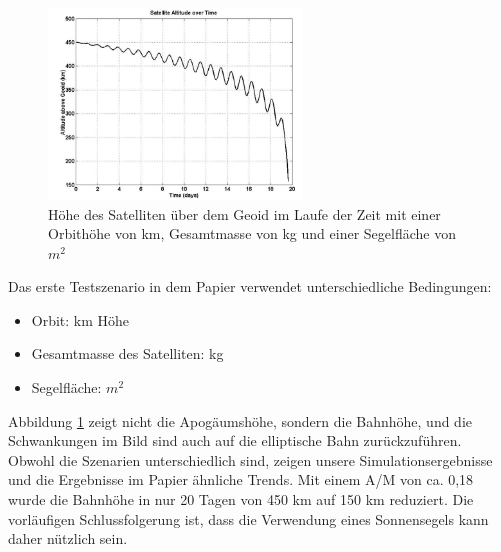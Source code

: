 \begin{figure}[htbp]
	\centering
	\includegraphics[width=0.6\textwidth]{bilder/Simulation_paper.png}
	\caption{Höhe des Satelliten über dem Geoid im Laufe der Zeit mit einer Orbithöhe von \unit[450]{km},  Gesamtmasse von \unit[140]{kg} und einer Segelfläche von \unit[25]{$m^2$}}
	\label{Simulation_paper}
\end{figure}
\clearpage
Das erste Testszenario in dem Papier verwendet unterschiedliche Bedingungen: 
\begin{itemize}
	\item Orbit: \unit[450]{km} Höhe
	\item Gesamtmasse des Satelliten: \unit[140 ]{kg}
	\item Segelfläche: \unit[25]{$m^2$}
\end{itemize}
Abbildung \ref{Simulation_paper} zeigt nicht die Apogäumshöhe, sondern die Bahnhöhe, und die Schwankungen im Bild sind auch auf die elliptische Bahn zurückzuführen. Obwohl die Szenarien unterschiedlich sind, zeigen unsere Simulationsergebnisse und die Ergebnisse im Papier ähnliche Trends. Mit einem A/M von ca. 0,18 wurde die Bahnhöhe in nur 20 Tagen von 450 km auf 150 km reduziert. Die vorläufigen Schlussfolgerung ist, dass die Verwendung eines Sonnensegels kann daher nützlich sein. 

